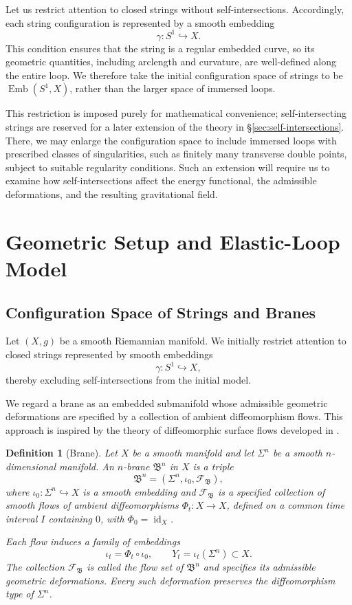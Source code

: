 \documentclass{article}
\newtheorem{dn}{Definition}
\numberwithin{tm}{section}
\numberwithin{dn}{section}
\numberwithin{as}{section}
\numberwithin{rk}{section}
\numberwithin{lem}{section}
\numberwithin{ax}{section}
\numberwithin{pp}{section}
\numberwithin{eg}{section}
\numberwithin{war}{section}
\numberwithin{equation}{section}
\numberwithin{prop}{section}
\numberwithin{nt}{section}
\numberwithin{rc}{section}
\begin{document}
Let us restrict attention to closed strings without
self-intersections. Accordingly, each string configuration is
represented by a smooth embedding
\[
\gamma:S^1\hookrightarrow X.
\]
This condition ensures that the string is a regular embedded
curve, so its geometric quantities, including arclength and
curvature, are well-defined along the entire loop. We therefore
take the initial configuration space of strings to be
$\operatorname{Emb}(S^1,X)$, rather than the larger space of
immersed loops.

This restriction is imposed purely for mathematical convenience; self-intersecting strings are reserved for a later extension of the theory  in \S\ref{sec:self-intersections}. There, we may enlarge the configuration space to include immersed loops with prescribed classes of singularities, such as finitely many transverse double points,
subject to suitable regularity conditions. Such an extension will require us to examine how self-intersections affect the energy functional, the admissible deformations, and the resulting gravitational field.

\section{Geometric Setup and Elastic-Loop Model}
\label{sec:geometric-model}

\subsection{Configuration Space of Strings and Branes}
\label{subsec:configuration-space}

Let $(X,g)$ be a smooth Riemannian manifold. We initially
restrict attention to closed strings represented by smooth
embeddings
\[
\gamma:S^1\hookrightarrow X,
\]
thereby excluding self-intersections from the initial model.

We regard a brane as an embedded submanifold whose admissible
geometric deformations are specified by a collection of
ambient diffeomorphism flows. This approach is inspired by
the theory of diffeomorphic surface flows developed in
\cite{ZhangEtAl}.

\begin{dn}[Brane] \label{brane}
	Let $X$ be a smooth manifold and let $\Sigma^n$ be a smooth
	$n$-dimensional manifold. An $n$-brane $\mathfrak{B}^n$ in $X$
	is a triple
	\[
	\mathfrak{B}^n
	=
	(\Sigma^n,\iota_0,\mathscr{F}_{\mathfrak{B}}),
	\]
	where $\iota_0:\Sigma^n\hookrightarrow X$ is a smooth
	embedding and $\mathscr{F}_{\mathfrak{B}}$ is a specified
	collection of smooth flows of ambient diffeomorphisms
	$\Phi_t:X\to X$, defined on a common time interval $I$
	containing $0$, with $\Phi_0=\operatorname{id}_X$.
	
	Each flow induces a family of embeddings
	\[
	\iota_t=\Phi_t\circ\iota_0,
	\qquad
	Y_t=\iota_t(\Sigma^n)\subset X.
	\]
	The collection $\mathscr{F}_{\mathfrak{B}}$ is called the
	\emph{flow set} of $\mathfrak{B}^n$ and specifies its
	admissible geometric deformations. Every such deformation
	preserves the diffeomorphism type of $\Sigma^n$.
\end{dn}
\end{document}
